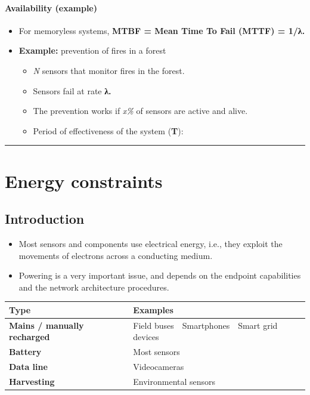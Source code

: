 \documentclass[
]{article}
\providecommand{\tightlist}{%
  \setlength{\itemsep}{0pt}\setlength{\parskip}{0pt}}
\begin{document}
\paragraph{Availability (example)}\label{availability-example}

\begin{itemize}
\tightlist
\item
  For memoryless systems, \textbf{MTBF = Mean Time To Fail (MTTF) =
  1/λ.}\\
\item
  \textbf{Example:} prevention of fires in a forest

  \begin{itemize}
  \tightlist
  \item
    \emph{N} sensors that monitor fires in the forest.
  \item
    Sensors fail at rate \textbf{λ.}
  \item
    The prevention works if \emph{x\%} of sensors are active and alive.
  \item
    Period of effectiveness of the system (\textbf{T}):
  \end{itemize}
\end{itemize}

\begin{center}\rule{0.5\linewidth}{0.5pt}\end{center}

\section{Energy constraints}\label{energy-constraints}

\subsection{Introduction}\label{introduction}

\begin{itemize}
\tightlist
\item
  Most sensors and components use electrical energy, i.e., they exploit
  the movements of electrons across a conducting medium.
\item
  Powering is a very important issue, and depends on the endpoint
  capabilities and the network architecture procedures.
\end{itemize}

\begin{longtable}[]{@{}ll@{}}
\toprule\noalign{}
Type & Examples \\
\midrule\noalign{}
\endhead
\bottomrule\noalign{}
\endlastfoot
\textbf{Mains / manually recharged} & Field buses Smartphones Smart grid
devices \\
\textbf{Battery} & Most sensors \\
\textbf{Data line} & Videocameras \\
\textbf{Harvesting} & Environmental sensors \\
\end{longtable}
\end{document}

